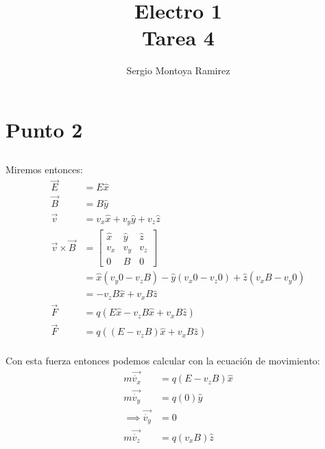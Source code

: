 \documentclass{report}
\title{\Huge{Electro 1}\\Tarea 4}
\author{\huge{Sergio Montoya Ramirez}}
\date{}
\begin{document}
\maketitle
\newpage%
\tableofcontents
\pagebreak

\chapter{Punto 2}

\section{}


Miremos entonces:
\begin{align*}
	\vec{E} &= E\hat{x}\\
	\vec{B} &= B\hat{y}\\
	\vec{v} &= v_x \hat{x}+ v_y \hat{y}+ v_z \hat{z} \\
	\vec{v} \times \vec{B} &= \begin{bmatrix}
		\hat{x} & \hat{y} & \hat{z} \\
		v_x & v_y & v_z \\
		0 & B & 0
	\end{bmatrix}\\
	&= \hat{x} \left( v_y 0 - v_z B \right) - \hat{y} \left( v_x 0 - v_z 0 \right) + \hat{z} \left( v_x B - v_y 0 \right) \\
	&=  - v_z B \hat{x}+  v_x B \hat{z}\\
	\vec{F} &= q \left( E\hat{x} - v_z B \hat{x} + v_x B \hat{z} \right) \\
	\vec{F} &= q \left( \left(E - v_z B\right) \hat{x} + v_x B \hat{z} \right) \\
\end{align*}

Con esta fuerza entonces podemos calcular con la ecuación de movimiento:
\begin{align*}
	m\vec{\dot{v_x}} &= q \left(E - v_z B\right) \hat{x} \\
	m\vec{\dot{v_y}} &= q \left( 0 \right) \hat{y} \\
	\implies \vec{\dot{v_y}} &= 0 \\
	m\vec{\dot{v_z}} &= q \left( v_x B \right) \hat{z} \\
\end{align*}
\end{document}
